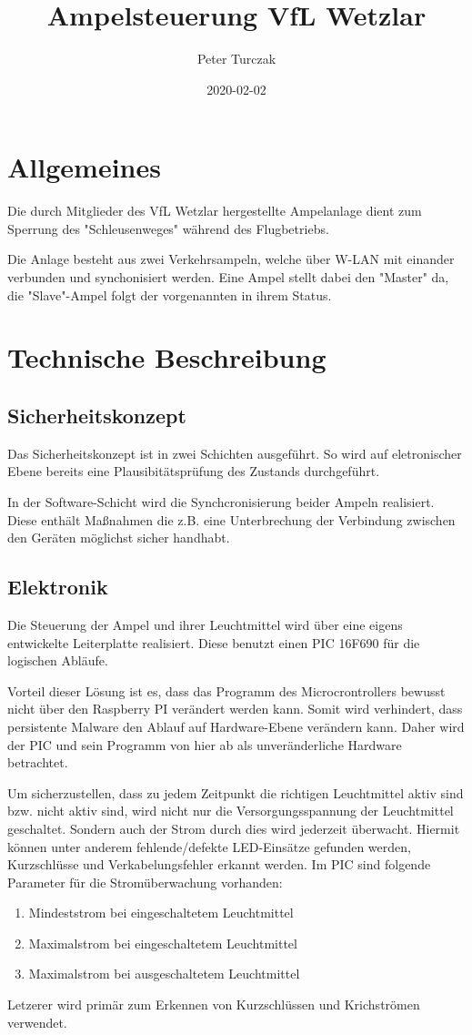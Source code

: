 \documentclass{scrartcl}
\begin{document}
\title{Ampelsteuerung VfL Wetzlar}
\author{Peter Turczak}
\date{2020-02-02}
\maketitle
\tableofcontents
\clearpage
\section{Allgemeines}
Die durch Mitglieder des VfL Wetzlar hergestellte Ampelanlage dient zum Sperrung des "Schleusenweges" während des Flugbetriebs.

Die Anlage besteht aus zwei Verkehrsampeln, welche über W-LAN mit einander verbunden und synchonisiert werden. Eine Ampel stellt dabei den "Master" da, die "Slave"-Ampel folgt der vorgenannten in ihrem Status.


\section{Technische Beschreibung}
\subsection{Sicherheitskonzept}
Das Sicherheitskonzept ist in zwei Schichten ausgeführt. So wird auf eletronischer Ebene bereits eine Plausibitätsprüfung des Zustands durchgeführt.

In der Software-Schicht wird die Synchcronisierung beider Ampeln realisiert. Diese enthält Maßnahmen die z.B. eine Unterbrechung der Verbindung zwischen den Geräten möglichst sicher handhabt.
\subsection{Elektronik}
Die Steuerung der Ampel und ihrer Leuchtmittel wird über eine eigens entwickelte Leiterplatte realisiert. Diese benutzt einen PIC 16F690 für die logischen Abläufe.

Vorteil dieser Lösung ist es, dass das Programm des Microcrontrollers bewusst nicht über den Raspberry PI verändert werden kann. Somit wird verhindert, dass persistente Malware den Ablauf auf Hardware-Ebene verändern kann. Daher wird der PIC und sein Programm von hier ab als unveränderliche Hardware betrachtet.

Um sicherzustellen, dass zu jedem Zeitpunkt die richtigen Leuchtmittel aktiv sind bzw. nicht aktiv sind, wird nicht nur die Versorgungsspannung der Leuchtmittel geschaltet. Sondern auch der Strom durch dies wird jederzeit überwacht. Hiermit können unter anderem fehlende/defekte LED-Einsätze gefunden werden, Kurzschlüsse und Verkabelungsfehler erkannt werden. Im PIC sind folgende Parameter für die Stromüberwachung vorhanden:
\begin{enumerate}
	\item Mindeststrom bei eingeschaltetem Leuchtmittel
	\item Maximalstrom bei eingeschaltetem Leuchtmittel
	\item Maximalstrom bei ausgeschaltetem Leuchtmittel
\end{enumerate}
Letzerer wird primär zum Erkennen von Kurzschlüssen und Krichströmen verwendet.
\end{document}
